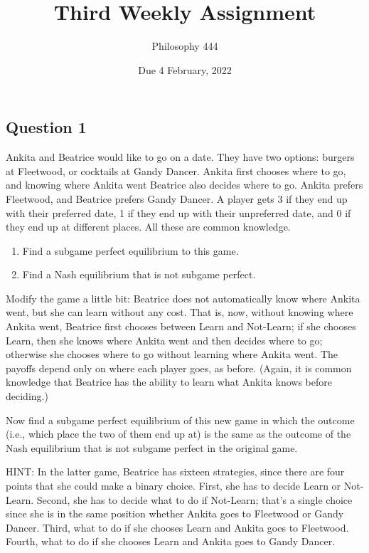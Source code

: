 \documentclass[
  11pt,
]{article}
\title{Third Weekly Assignment}
\author{Philosophy 444}
\date{Due 4 February, 2022}
\providecommand{\tightlist}{%
  \setlength{\itemsep}{0pt}\setlength{\parskip}{0pt}}
\begin{document}
\maketitle

\hypertarget{question-1}{%
\subsection{Question 1}\label{question-1}}

Ankita and Beatrice would like to go on a date. They have two options:
burgers at Fleetwood, or cocktails at Gandy Dancer. Ankita first chooses
where to go, and knowing where Ankita went Beatrice also decides where
to go. Ankita prefers Fleetwood, and Beatrice prefers Gandy Dancer. A
player gets 3 if they end up with their preferred date, 1 if they end up
with their unpreferred date, and 0 if they end up at different places.
All these are common knowledge.

\begin{enumerate}
\def\labelenumi{\alph{enumi}.}
\tightlist
\item
  Find a subgame perfect equilibrium to this game.
\item
  Find a Nash equilibrium that is not subgame perfect.
\end{enumerate}

Modify the game a little bit: Beatrice does not automatically know where
Ankita went, but she can learn without any cost. That is, now, without
knowing where Ankita went, Beatrice first chooses between Learn and
Not-Learn; if she chooses Learn, then she knows where Ankita went and
then decides where to go; otherwise she chooses where to go without
learning where Ankita went. The payoffs depend only on where each player
goes, as before. (Again, it is common knowledge that Beatrice has the
ability to learn what Ankita knows before deciding.)

Now find a subgame perfect equilibrium of this new game in which the
outcome (i.e., which place the two of them end up at) is the same as the
outcome of the Nash equilibrium that is not subgame perfect in the
original game.

HINT: In the latter game, Beatrice has sixteen strategies, since there
are four points that she could make a binary choice. First, she has to
decide Learn or Not-Learn. Second, she has to decide what to do if
Not-Learn; that's a single choice since she is in the same position
whether Ankita goes to Fleetwood or Gandy Dancer. Third, what to do if
she chooses Learn and Ankita goes to Fleetwood. Fourth, what to do if
she chooses Learn and Ankita goes to Gandy Dancer.
\end{document}
